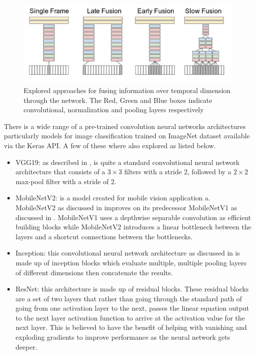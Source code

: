 \begin{figure}
    \includegraphics[width=\linewidth]{K_models.JPG}
    \caption{\citep{KarpathyCVPR14} Explored approaches for fusing information over temporal dimension through the network.  The Red, Green and Blue boxes indicate convolutional, normalization and pooling layers respectively}
    \label{fig:k_models}
\end{figure}

There is a wide range of a pre-trained convolution neural networks architectures particularly models for image classification trained on ImageNet dataset available via the Keras API.  A few of these where also explored as listed below.
\begin{itemize}
    \item VGG19: as described in \citep{simonyan2014deep}, is quite a standard convolutional neural network architecture that consists of a $3 \times3$  filters with a stride 2, followed by a $2\times2$ max-pool filter with a stride of 2.
    \item MobileNetV2: is a model created for mobile vision application a. MobileNetV2 as discussed in \cite{Sandler_2018} improves on its predecessor MobileNetV1 as discussed in \citep{howard2017mobilenets}.  MobileNetV1 uses a depthwise separable convolution as efficient building blocks while MobileNetV2 introduces a linear bottleneck between the layers and a shortcut connections between the bottlenecks.
    \item Inception: this convolutional neural network architecture as discussed in \citep{Szegedy_2016} is made up of inception blocks which evaluate multiple, multiple pooling layers of different dimensions then concatenate the results.
    \item ResNet: this architecture \citep{He_2016} is made up of residual blocks. These residual blocks are a set of two layers that rather than going through the standard path of going from one activation layer to the next, passes the linear equation output to the next layer activation function to arrive at the activation value for the next layer. This is believed to have the benefit of helping with vanishing and exploding gradients to improve performance as the neural network gets deeper.
\end{itemize}


